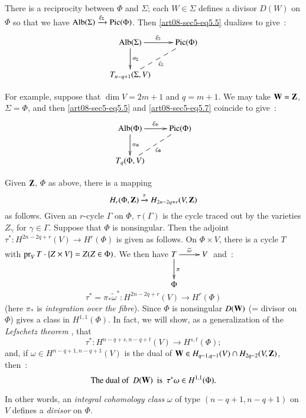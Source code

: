 \begin{remark*}
There is a reciprocity between $\Phi$ and $\Sigma$; each $W\in \Sigma$ defines a divisor $D(W)$ on $\Phi$ so that we have $\operatorname{\mathrm{Alb}}(\Sigma)\xrightarrow{\xi_{\Sigma}}\operatorname{\mathrm{Pic}}(\Phi)$. Then \eqref{art08-sec5-eq5.5} dualizes to give~:
\begin{equation}
\vcenter{\xymatrix{
\Alb(\Sigma)\ar[r]^-{\xi_{\Sigma}}\ar[d]^{\alpha_{\Sigma}} & \Pic(\Phi)\\
T_{n-q+1}(\Sigma,V)\ar@{--}[ur]_{\zeta_{\Sigma}} &
}}\label{art08-sec5-eq5.7}
\end{equation}

For example, suppose that $\dim V=2m+1$ and $q=m+1$. We may take $\mathbf{W}=\mathbf{Z}$, $\Sigma=\Phi$, and then \eqref{art08-sec5-eq5.5} and \eqref{art08-sec5-eq5.7} coincide to give~:
\begin{equation}
\vcenter{\xymatrix{
\Alb(\Phi)\ar[r]^-{\xi_{\Phi}}\ar[d]^-{\alpha_{\Phi}} & \Pic(\Phi)\\
T_{q}(\Phi,V)\ar@{--}[ur]_-{\zeta_{\Phi}} & 
}}\label{art08-sec5-eq5.8}
\end{equation}

Given $\mathbf{Z}$, $\Phi$ as above, there is a mapping
\begin{equation}
H_{r}(\Phi,\mathbf{Z})\xrightarrow{\tau}H_{2n-2q+r}(V,\mathbf{Z})\label{art08-sec5-eq5.9}
\end{equation}
as follows. Given an $r$-cycle $\Gamma$ on $\Phi$, $\tau(\Gamma)$ is the cycle traced out by the varieties $Z_{\gamma}$ for $\gamma\in \Gamma$. Suppose that $\Phi$ is nonsingular. Then the adjoint $\tau^{*}:H^{2n-2q+r}(V)\to H^{r}(\Phi)$ is given as follows. On $\Phi\times V$, there is a cycle $T$ with $\operatorname{\mathrm{pr}}_{V}T\cdot\{Z\times V\}=Z(Z\in \Phi)$. We then have\pageoriginale $\xymatrix{T\ar[d]^{\pi}\ar[r]^-{\widetilde{\omega}} & V\\ \Phi &}$ and~:
\begin{equation}
\tau^{*}=\pi_{*}\widetilde{\omega}^{*}:H^{2n-2q+r}(V)\to H^{r}(\Phi)\label{art08-sec5-eq5.10}
\end{equation}
(here $\pi_{*}$ is {\em integration over the fibre}). Since $\Phi$ is nonsingular $D(\mathbf{W})$ (= divisor on $\Phi$) gives a class in $H^{1,1}(\Phi)$. In fact, we will show, as a generalization of the {\em Lefschetz theorem} \cite{art08-key19}, that
\begin{equation}
\tau^{*}:H^{n-q+s,n-q+t}(V)\to H^{s,t}(\Phi);\label{art08-sec5-eq5.11}
\end{equation}
and, if $\omega\in H^{n-q+1,n-q+1}(V)$ is the dual of $\mathbf{W}\in H_{q-1,q-1}(V)\cap H_{2q-2}(V,\mathbf{Z})$, then~:
\begin{equation}
\text{The dual of~ } D(\mathbf{W})\text{~ is ~} \tau^{*}\omega\in H^{1,1}(\Phi).\label{art08-sec5-eq5.12}
\end{equation}

In other words, an {\em integral cohomology class} $\omega$ of type $(n-q+1, n-q+1)$ on $V$ defines a {\em divisor} on $\Phi$.
\end{remark*}


